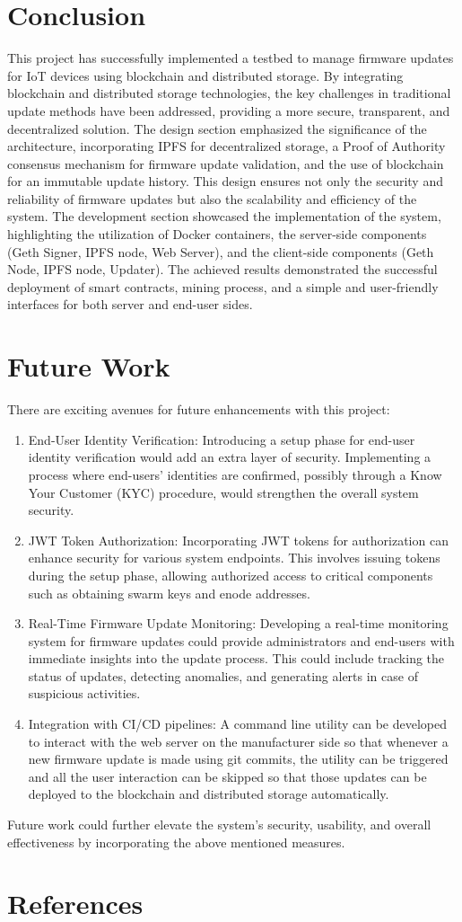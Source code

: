 \documentclass{article}
\begin{document}
\section{Conclusion}
This project has successfully implemented a testbed to manage firmware updates for IoT devices using blockchain and distributed storage. By integrating blockchain and distributed storage technologies, the key challenges in traditional update methods have been addressed, providing a more secure, transparent, and decentralized solution.
The design section emphasized the significance of the architecture, incorporating IPFS for decentralized storage, a Proof of Authority consensus mechanism for firmware update validation, and the use of blockchain for an immutable update history. This design ensures not only the security and reliability of firmware updates but also the scalability and efficiency of the system.
The development section showcased the implementation of the system, highlighting the utilization of Docker containers, the server-side components (Geth Signer, IPFS node, Web Server), and the client-side components (Geth Node, IPFS node, Updater). The achieved results demonstrated the successful deployment of smart contracts, mining process, and a simple and user-friendly interfaces for both server and end-user sides.
\newpage
\section{Future Work}
There are exciting avenues for future enhancements with this project:
\begin{enumerate}
    \item End-User Identity Verification: Introducing a setup phase for end-user identity verification would add an extra layer of security. Implementing a process where end-users' identities are confirmed, possibly through a Know Your Customer (KYC) procedure, would strengthen the overall system security.
    \item JWT Token Authorization: Incorporating JWT tokens for authorization can enhance security for various system endpoints. This involves issuing tokens during the setup phase, allowing authorized access to critical components such as obtaining swarm keys and enode addresses.
    \item Real-Time Firmware Update Monitoring: Developing a real-time monitoring system for firmware updates could provide administrators and end-users with immediate insights into the update process. This could include tracking the status of updates, detecting anomalies, and generating alerts in case of suspicious activities.
    \item Integration with CI/CD pipelines: A command line utility can be developed to interact with the web server on the manufacturer side so that whenever a new firmware update is made using git commits, the utility can be triggered and all the user interaction can be skipped so that those updates can be deployed to the blockchain and distributed storage automatically.
\end{enumerate}
Future work could further elevate the system's security, usability, and overall effectiveness by incorporating the above mentioned measures.
\newpage
\section{References}
\printbibliography
\end{document}
